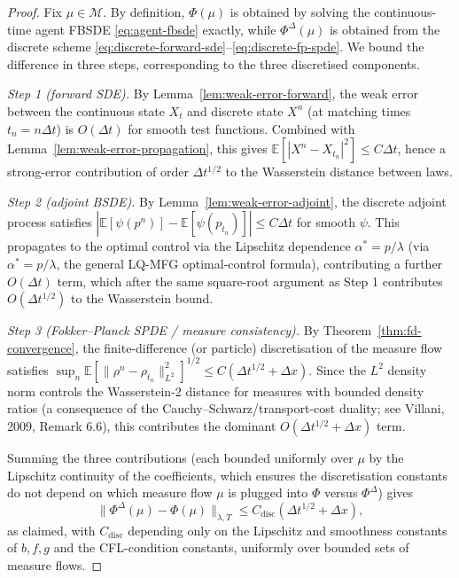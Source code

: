 \begin{proof}
Fix $\mu \in \mathcal{M}$. By definition, $\Phi(\mu)$ is obtained by solving the
continuous-time agent FBSDE \eqref{eq:agent-fbsde} exactly, while $\Phi^\Delta(\mu)$
is obtained from the discrete scheme
\eqref{eq:discrete-forward-sde}--\eqref{eq:discrete-fp-spde}. We bound the
difference in three steps, corresponding to the three discretised components.

\textit{Step 1 (forward SDE).} By Lemma~\ref{lem:weak-error-forward}, the weak
error between the continuous state $X_t$ and discrete state $X^n$ (at matching
times $t_n = n\Delta t$) is $O(\Delta t)$ for smooth test functions. Combined with
Lemma~\ref{lem:weak-error-propagation}, this gives
$\mathbb{E}[|X^n - X_{t_n}|^2] \leq C\Delta t$, hence a strong-error contribution
of order $\Delta t^{1/2}$ to the Wasserstein distance between laws.

\textit{Step 2 (adjoint BSDE).} By Lemma~\ref{lem:weak-error-adjoint}, the
discrete adjoint process satisfies $|\mathbb{E}[\psi(p^n)] -
\mathbb{E}[\psi(p_{t_n})]| \leq C\Delta t$ for smooth $\psi$. This propagates to
the optimal control via the Lipschitz dependence $\alpha^* = p/\lambda$
(via $\alpha^* = p/\lambda$, the general LQ-MFG optimal-control formula), contributing a further $O(\Delta t)$ term, which
after the same square-root argument as Step 1 contributes $O(\Delta t^{1/2})$ to
the Wasserstein bound.

\textit{Step 3 (Fokker--Planck SPDE / measure consistency).} By
Theorem~\ref{thm:fd-convergence}, the finite-difference (or particle) discretisation
of the measure flow satisfies
$\sup_n \mathbb{E}[\|\rho^n - \rho_{t_n}\|_{L^2}^2]^{1/2} \leq C(\Delta t^{1/2} +
\Delta x)$. Since the $L^2$ density norm controls the Wasserstein-2 distance for
measures with bounded density ratios (a consequence of the
Cauchy--Schwarz/transport-cost duality; see Villani, 2009, Remark 6.6), this
contributes the dominant $O(\Delta t^{1/2} + \Delta x)$ term.

Summing the three contributions (each bounded uniformly over $\mu$ by the
Lipschitz continuity of the coefficients, which ensures the discretisation
constants do not depend on which measure flow $\mu$ is plugged into $\Phi$ versus
$\Phi^\Delta$) gives
\[
    \|\Phi^\Delta(\mu) - \Phi(\mu)\|_{\lambda,T} \leq C_{\mathrm{disc}}(\Delta
    t^{1/2} + \Delta x),
\]
as claimed, with $C_{\mathrm{disc}}$ depending only on the Lipschitz and
smoothness constants of $b, f, g$ and the CFL-condition constants, uniformly over
bounded sets of measure flows.
\end{proof}


